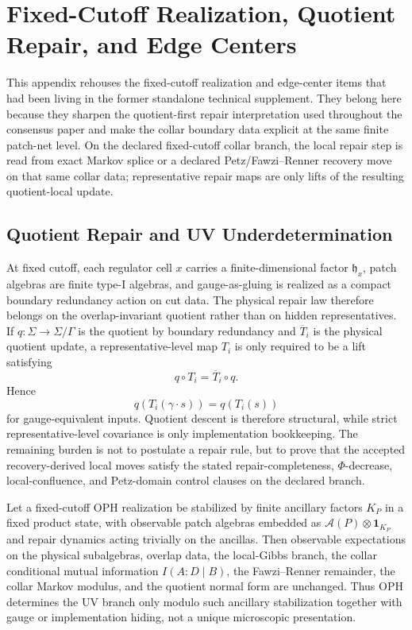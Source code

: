 \section{Fixed-Cutoff Realization, Quotient Repair, and Edge Centers}
\label{app:consensus-fixed-cutoff-port}

This appendix rehouses the fixed-cutoff realization and edge-center items that had been living in
the former standalone technical supplement. They belong here because they sharpen the
quotient-first repair interpretation used throughout the consensus paper and make the collar
boundary data explicit at the same finite patch-net level. On the declared fixed-cutoff collar
branch, the local repair step is read from exact Markov splice or a declared Petz/Fawzi--Renner
recovery move on that same collar data; representative repair maps are only lifts of the resulting
quotient-local update.

\subsection{Quotient Repair and UV Underdetermination}

At fixed cutoff, each regulator cell \(x\) carries a finite-dimensional factor
\(\mathfrak h_x\), patch algebras are finite type-I algebras, and gauge-as-gluing is realized as
a compact boundary redundancy action on cut data. The physical repair law therefore belongs on the
overlap-invariant quotient rather than on hidden representatives. If \(q:\Sigma\to\Sigma/\Gamma\)
is the quotient by boundary redundancy and \(\overline T_i\) is the physical quotient update, a
representative-level map \(T_i\) is only required to be a lift satisfying
\[
q\circ T_i=\overline T_i\circ q.
\]
Hence
\[
q(T_i(\gamma\cdot s))=q(T_i(s))
\]
for gauge-equivalent inputs. Quotient descent is therefore structural, while strict
representative-level covariance is only implementation bookkeeping. The remaining burden is not to
postulate a repair rule, but to prove that the accepted recovery-derived local moves satisfy the
stated repair-completeness, \(\Phi\)-decrease, local-confluence, and Petz-domain control clauses
on the declared branch.

\begin{proposition}
Let a fixed-cutoff OPH realization be stabilized by finite ancillary factors \(K_P\) in a fixed
product state, with observable patch algebras embedded as
\(\mathcal A(P)\otimes \mathbf 1_{K_P}\) and repair dynamics acting trivially on the ancillas.
Then observable expectations on the physical subalgebras, overlap data, the local-Gibbs branch,
the collar conditional mutual information \(I(A:D\mid B)\), the Fawzi--Renner remainder, the
collar Markov modulus, and the quotient normal form are unchanged. Thus OPH determines the UV
branch only modulo such ancillary stabilization together with gauge or implementation hiding, not
a unique microscopic presentation.
\end{proposition}


